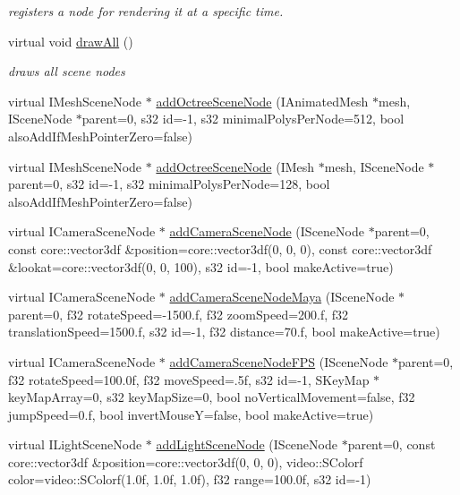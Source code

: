 \begin{DoxyCompactItemize}
\begin{DoxyCompactList}\small\item\em registers a node for rendering it at a specific time. \end{DoxyCompactList}\item 
virtual void \hyperlink{classirr_1_1scene_1_1_c_scene_manager_af861474ffb96b9d4d2d9a6d6303cdb6a}{draw\-All} ()
\begin{DoxyCompactList}\small\item\em draws all scene nodes \end{DoxyCompactList}\item 
virtual I\-Mesh\-Scene\-Node $\ast$ \hyperlink{classirr_1_1scene_1_1_c_scene_manager_aa3be92a6e7aefe7a9a6e8948232affa2}{add\-Octree\-Scene\-Node} (I\-Animated\-Mesh $\ast$mesh, I\-Scene\-Node $\ast$parent=0, s32 id=-\/1, s32 minimal\-Polys\-Per\-Node=512, bool also\-Add\-If\-Mesh\-Pointer\-Zero=false)
\item 
virtual I\-Mesh\-Scene\-Node $\ast$ \hyperlink{classirr_1_1scene_1_1_c_scene_manager_a9d5f2d928b78ff4465b7b786f8f44797}{add\-Octree\-Scene\-Node} (I\-Mesh $\ast$mesh, I\-Scene\-Node $\ast$parent=0, s32 id=-\/1, s32 minimal\-Polys\-Per\-Node=128, bool also\-Add\-If\-Mesh\-Pointer\-Zero=false)
\item 
virtual I\-Camera\-Scene\-Node $\ast$ \hyperlink{classirr_1_1scene_1_1_c_scene_manager_a0c93fe59faade8c2719c0dbac1a1f859}{add\-Camera\-Scene\-Node} (I\-Scene\-Node $\ast$parent=0, const core\-::vector3df \&position=core\-::vector3df(0, 0, 0), const core\-::vector3df \&lookat=core\-::vector3df(0, 0, 100), s32 id=-\/1, bool make\-Active=true)
\item 
virtual I\-Camera\-Scene\-Node $\ast$ \hyperlink{classirr_1_1scene_1_1_c_scene_manager_afca015ff12264168f9f6ef51dc0508d8}{add\-Camera\-Scene\-Node\-Maya} (I\-Scene\-Node $\ast$parent=0, f32 rotate\-Speed=-\/1500.f, f32 zoom\-Speed=200.f, f32 translation\-Speed=1500.f, s32 id=-\/1, f32 distance=70.f, bool make\-Active=true)
\item 
virtual I\-Camera\-Scene\-Node $\ast$ \hyperlink{classirr_1_1scene_1_1_c_scene_manager_acaaf42fc8078c742d34b800fa9a032cd}{add\-Camera\-Scene\-Node\-F\-P\-S} (I\-Scene\-Node $\ast$parent=0, f32 rotate\-Speed=100.\-0f, f32 move\-Speed=.\-5f, s32 id=-\/1, S\-Key\-Map $\ast$key\-Map\-Array=0, s32 key\-Map\-Size=0, bool no\-Vertical\-Movement=false, f32 jump\-Speed=0.\-f, bool invert\-Mouse\-Y=false, bool make\-Active=true)
\item 
virtual I\-Light\-Scene\-Node $\ast$ \hyperlink{classirr_1_1scene_1_1_c_scene_manager_ad9eb844548c09912553ef857f96380a0}{add\-Light\-Scene\-Node} (I\-Scene\-Node $\ast$parent=0, const core\-::vector3df \&position=core\-::vector3df(0, 0, 0), video\-::\-S\-Colorf color=video\-::\-S\-Colorf(1.\-0f, 1.\-0f, 1.\-0f), f32 range=100.\-0f, s32 id=-\/1)

\end{DoxyCompactItemize}
